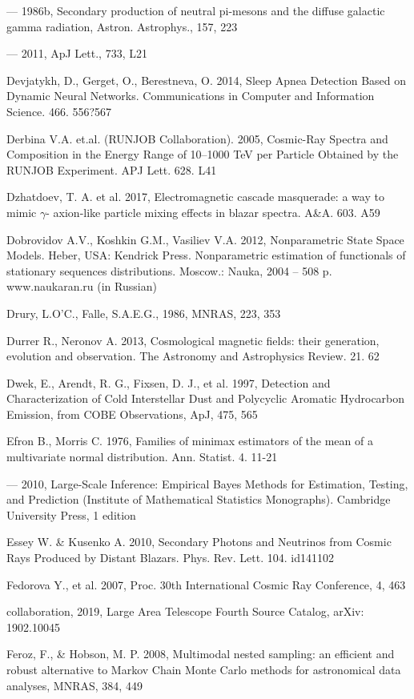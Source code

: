 --- 1986b, Secondary production of neutral pi-mesons and the diffuse galactic gamma radiation, Astron. Astrophys., 157, 223

--- 2011, ApJ Lett., 733, L21

Devjatykh, D., Gerget, O., Berestneva, O. 2014, Sleep Apnea Detection Based on Dynamic Neural Networks. Communications in Computer and Information Science. 466. 556?567

Derbina V.A. et.al. (RUNJOB Collaboration). 2005, Cosmic-Ray Spectra and Composition in the Energy Range of 10--1000 TeV per Particle Obtained by the RUNJOB Experiment. APJ Lett. 628. L41

Dzhatdoev, T. A. et al. 2017, Electromagnetic cascade masquerade: a way to mimic $\gamma$- axion-like particle mixing effects in blazar spectra. A\&A. 603. A59

Dobrovidov A.V., Koshkin G.M., Vasiliev V.A. 2012, Nonparametric State Space Models. Heber, USA: Kendrick Press. Nonparametric estimation of functionals of stationary sequences distributions. Moscow.: Nauka, 2004 -- 508 p. www.naukaran.ru (in Russian)

Drury, L.O'C., Falle, S.A.E.G., 1986, MNRAS, 223, 353

Durrer R., Neronov A. 2013, Cosmological magnetic fields: their generation, evolution and observation. The Astronomy and Astrophysics Review. 21. 62

Dwek, E., Arendt, R. G., Fixsen, D. J., et al. 1997, Detection and Characterization of Cold Interstellar Dust and Polycyclic Aromatic Hydrocarbon Emission, from COBE Observations, ApJ, 475, 565

Efron B., Morris C. 1976, Families of minimax estimators of the mean of a multivariate normal distribution. Ann. Statist. 4. 11-21

--- 2010, Large-Scale Inference: Empirical Bayes Methods for Estimation, Testing, and Prediction (Institute of Mathematical Statistics Monographs). Cambridge University Press, 1 edition

Essey W. \& Kusenko A. 2010, Secondary Photons and Neutrinos from Cosmic Rays Produced by Distant Blazars. Phys. Rev. Lett. 104. id141102

Fedorova Y., et al. 2007, Proc. 30th International Cosmic Ray Conference, 4, 463

\fermilat{} collaboration, 2019, \fermi{} Large Area Telescope Fourth Source Catalog, arXiv: 1902.10045

Feroz, F., \& Hobson, M. P. 2008, Multimodal nested sampling: an efficient and robust alternative to Markov Chain Monte Carlo methods for astronomical data analyses, MNRAS, 384, 449

